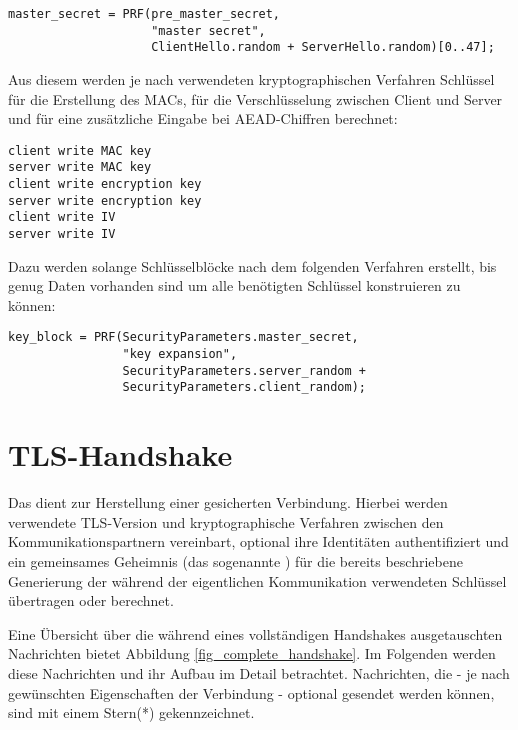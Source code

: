\begin{lstlisting}
master_secret = PRF(pre_master_secret, 
					"master secret",
					ClientHello.random + ServerHello.random)[0..47];
\end{lstlisting}

Aus diesem \mastersecret{} werden je nach verwendeten kryptographischen Verfahren Schlüssel für die Erstellung des MACs, für die Verschlüsselung zwischen Client und Server und für eine zusätzliche Eingabe bei AEAD-Chiffren berechnet:
\begin{lstlisting}
client write MAC key
server write MAC key
client write encryption key
server write encryption key
client write IV
server write IV
\end{lstlisting}

Dazu werden solange Schlüsselblöcke nach dem folgenden Verfahren erstellt, bis genug Daten vorhanden sind um alle benötigten Schlüssel konstruieren zu können: 

\begin{lstlisting}
key_block = PRF(SecurityParameters.master_secret,
                "key expansion",
                SecurityParameters.server_random +
                SecurityParameters.client_random);
\end{lstlisting}


\section{TLS-Handshake}

\label{sec_tls_handshake}

Das \handshakeprotocol{} dient zur Herstellung einer gesicherten Verbindung. Hierbei werden verwendete TLS-Version und kryptographische Verfahren zwischen den Kommunikationspartnern vereinbart, optional ihre Identitäten authentifiziert und ein gemeinsames Geheimnis (das sogenannte \premastersecret{}) für die bereits beschriebene Generierung der während der eigentlichen Kommunikation verwendeten Schlüssel übertragen oder berechnet. 

Eine Übersicht über die während eines vollständigen Handshakes ausgetauschten Nachrichten bietet Abbildung \ref{fig_complete_handshake}. Im Folgenden werden diese Nachrichten und ihr Aufbau im Detail betrachtet. Nachrichten, die - je nach gewünschten Eigenschaften der Verbindung - optional gesendet werden können, sind mit einem Stern(*) gekennzeichnet.


